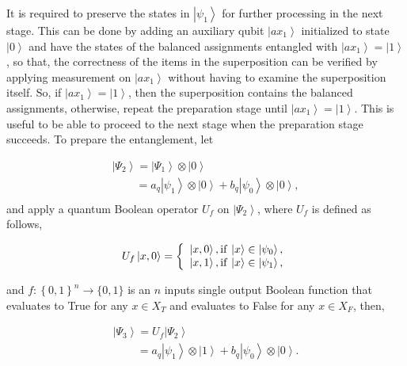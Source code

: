 \documentclass[a4paper]{article}
\begin{document}
It is required to preserve the states in $\left| {\psi _1 } \right\rangle$ for further processing in the next stage. 
This can be done by adding an auxiliary qubit $\left| {ax_1 } \right\rangle$ initialized to state 
$\left| {0} \right\rangle$ and have the states of the balanced assignments entangled with 
$\left| {ax_1 } \right\rangle = \left| {1} \right\rangle$, so that, 
the correctness of the items in the 
superposition can be verified by applying measurement on $\left| {ax_1 } \right\rangle$ without having to examine 
the superposition itself. So, if $\left| {ax_1 } \right\rangle = \left| {1 } \right\rangle$, 
then the superposition contains the balanced assignments, 
otherwise, repeat the preparation stage until $\left| {ax_1 } \right\rangle = \left| {1 } \right\rangle$. 
This is useful to be able to proceed to the next stage when the preparation stage succeeds. To prepare the entanglement, let

\begin{equation}
\begin{array}{l}
\left| {\Psi _2 } \right\rangle = \left| {\Psi _1 } \right\rangle \otimes \left| {0 } \right\rangle\\  
\,\,\,\,\,\,\,\,\,\,\,\,\,= a_q \left| {\psi _1 } \right\rangle \otimes \left| {0 } \right\rangle + b_q \left| {\psi _0 } \right\rangle \otimes \left| {0 } \right\rangle,\\
\end{array}
\end{equation}
\noindent 
and apply a quantum Boolean operator $U_f$ on $\left| {\Psi _2 } \right\rangle$, where $U_f$ is defined as follows,

\begin{equation}
U_f \left| {x,0} \right\rangle  = \left\{ {\begin{array}{*{20}c}
   {\left| {x ,0} \right\rangle ,{\rm if }\, \left|x\right\rangle \in \left|\psi _0\right\rangle,}  \\
   {\left| {x ,1} \right\rangle ,{\rm if }\, \left|x\right\rangle \in \left|\psi _1\right\rangle,}  \\
\end{array}} \right.
\end{equation}

\noindent
and $f:\left\{ {0,1} \right\}^n  \to \{ 0,1\}$ is an $n$ inputs single output Boolean function that 
evaluates to True for any $x \in X_T$ and evaluates to False for any $x \in X_F$, then,

\begin{equation}
\begin{array}{l}
\left| {\Psi _3 } \right\rangle = U_f \left| {\Psi _2 } \right\rangle \\  
\,\,\,\,\,\,\,\,\,\,\,\,\,= a_q \left| {\psi _1 } \right\rangle \otimes \left| {1 } \right\rangle + b_q \left| {\psi _0 } \right\rangle \otimes \left| {0 } \right\rangle.\\
\end{array}
\end{equation}
\end{document}
